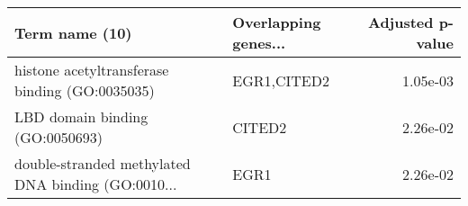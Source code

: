 \begin{tabular}{llr}
\toprule
                                    Term name (10) & Overlapping genes... &  Adjusted p-value \\
\midrule
    histone acetyltransferase binding (GO:0035035) &          EGR1,CITED2 &          1.05e-03 \\
                   LBD domain binding (GO:0050693) &               CITED2 &          2.26e-02 \\
double-stranded methylated DNA binding (GO:0010... &                 EGR1 &          2.26e-02 \\
\bottomrule
\end{tabular}

